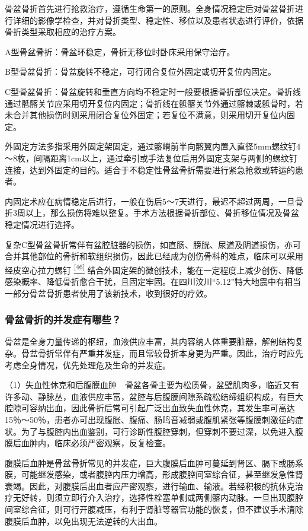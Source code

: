 骨盆骨折首先进行抢救治疗，遵循生命第一的原则。全身情况稳定后对骨盆骨折进行详细的影像学检查，并对骨折类型、稳定性、移位以及患者状态进行评价，依据骨折类型采取相应的治疗方案。

A型骨盆骨折：骨盆环稳定，骨折无移位时卧床采用保守治疗。

B型骨盆骨折：骨盆旋转不稳定，可行闭合复位外固定或切开复位内固定。

C型骨盆骨折：骨盆旋转和垂直方向均不稳定时一般要根据骨折部位决定。骨折线通过骶髂关节应采用切开复位内固定；骨折线在骶髂关节外通过髂棘或骶骨时，若未合并其他损伤时则采用闭合复位外固定；若复位不满意，则采用切开复位内固定。

外固定方法多指采用外固定架固定，通过髂嵴前半向髂翼内置入直径5mm螺纹钉4～8枚，间隔距离1cm以上，通过牵引或手法复位后用外固定支架与两侧的螺纹钉连接，达到外固定的目的。适合于不稳定性骨盆骨折需要进行紧急抢救或转运的患者。

内固定术应在病情稳定后进行，一般在伤后5～7天进行，最迟不超过两周，一旦骨折3周以上，那么损伤将难以整复。手术方法根据骨折部位、骨折移位情况及骨盆稳定情况进行选择。

复杂C型骨盆骨折常伴有盆腔脏器的损伤，如直肠、膀胱、尿道及阴道损伤，亦可合并其他部位的骨折和软组织损伤，因此已经成为创伤骨科的难点，临床可以采用经皮空心拉力螺钉
\protect\hyperlink{text00024.htmlux5cux23ch46-23}{\textsuperscript{{[}46{]}}}
结合外固定架的微创技术，能在一定程度上减少创伤、降低感染概率、降低骨折愈合干扰，且固定牢固。在四川汶川“5.12”特大地震中有相当一部分骨盆骨折患者使用了该新技术，收到很好的疗效。

\subsubsection{骨盆骨折的并发症有哪些？}

骨盆是全身力量传递的枢纽，血液供应丰富，其内容纳人体重要脏器，解剖结构复杂。骨盆骨折常伴有严重并发症，而且常较骨折本身更为严重。因此，治疗时应先考虑全身情况，优先处理危及生命的并发症。

（1）失血性休克和后腹膜血肿　骨盆各骨主要为松质骨，盆壁肌肉多，临近又有许多动、静脉丛，血液供应丰富，盆腔与后腹膜间隙系疏松结缔组织构成，有巨大腔隙可容纳出血，因此骨折后常可引起广泛出血致失血性休克，其发生率可高达15％～50％，患者亦可出现腹胀、腹痛、肠鸣音减弱或腹肌紧张等腹膜刺激征的症状。为了与腹腔内出血鉴别，可行诊断性腹腔穿刺，但穿刺不要过深，以免进入腹膜后血肿内，临床必须严密观察，反复检查。

腹膜后血肿是骨盆骨折常见的并发症，巨大腹膜后血肿可蔓延到肾区、膈下或肠系膜，可能继发感染，或者腹腔内压力增高，形成腹腔间室综合征，甚至继发急性肾衰竭。因此，对腹膜后出血者应严密观察，进行输血、输液。若经积极的抗休克治疗无好转，则须立即行介入治疗，选择性栓塞单侧或两侧髂内动脉。一旦出现腹腔间室综合征，则可行开腹减压，有利于肾脏等器官功能的恢复，但不建议手术清除腹膜后血肿，以免出现无法逆转的大出血。

